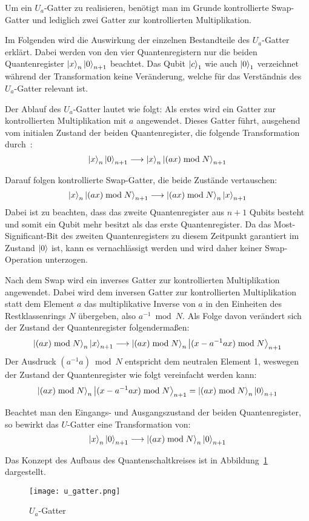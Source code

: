 Um ein \(U_a\)-Gatter zu realisieren, benötigt man im Grunde kontrollierte Swap-Gatter und 
lediglich zwei Gatter zur kontrollierten Multiplikation. 
 
Im Folgenden wird die Auswirkung der einzelnen Bestandteile des \(U_a\)-Gatter erklärt.
Dabei werden von den vier Quantenregistern nur die beiden 
Quantenregister \(\ket{x}_{n}\ket{0}_{n+1}\) beachtet.
Das Qubit \(\ket{c}_1\) wie auch \(\ket{0}_1\) verzeichnet während der Transformation keine Veränderung, 
welche für das Verständnis des \(U_a\)-Gatter relevant ist.

Der Ablauf des \(U_a\)-Gatter lautet wie folgt:
Als erstes wird ein Gatter zur kontrollierten Multiplikation mit \(a\) angewendet. 
Dieses Gatter führt, 
ausgehend vom initialen Zustand der beiden Quantenregister, 
die folgende Transformation durch~\cite{beauregard2003circuit}:
\[
  \ket{x}_{n}\ket{0}_{n+1}
  \longrightarrow
  \ket{x}_{n}\ket{(ax)\bmod N}_{n+1}
  \]

Darauf folgen kontrollierte Swap-Gatter, die beide Zustände vertauschen:
\[
  \ket{x}_{n}\ket{(ax)\bmod N}_{n+1}
\longrightarrow
\ket{(ax)\bmod N}_{n}\ket{x}_{n+1}
\]
Dabei ist zu beachten, 
dass das zweite Quantenregister aus \(n+1\) Qubits besteht und
somit ein Qubit mehr besitzt als das erste Quantenregister.
Da das Most-Significant-Bit des zweiten Quantenregisters zu diesem Zeitpunkt garantiert im Zustand \(\ket{0}\) ist, 
kann es vernachlässigt werden und wird daher keiner Swap-Operation unterzogen.

Nach dem Swap wird ein inverses Gatter zur kontrollierten Multiplikation angewendet.
Dabei wird dem inversen Gatter zur kontrollierten Multiplikation statt dem Element \(a\) 
das multiplikative Inverse von \(a\) in den Einheiten des Restklassenrings \(N\) übergeben, 
also \(a^{-1} \bmod N\).
Als Folge davon verändert sich der Zustand der Quantenregister folgendermaßen:  
\[\ket{(ax)\bmod N}_{n}\ket{x}_{n+1}
\longrightarrow
\ket{(ax)\bmod N}_{n}\ket{(x-a^{-1}ax)\bmod N}_{n+1}
\] 
Der Ausdruck \((a^{-1}a)\bmod N\) entspricht dem neutralen Element 1, 
weswegen der Zustand der Quantenregister wie folgt vereinfacht werden kann:  
\[
\ket{(ax)\bmod N}_{n}\ket{(x-a^{-1}ax)\bmod N}_{n+1}
=
\ket{(ax)\bmod N}_{n}\ket{0}_{n+1}
\] 

Beachtet man den Eingangs- und Ausgangszustand der beiden Quantenregister, 
so bewirkt das \(U\)-Gatter eine Transformation von:
 \[\ket{x}_{n}\ket{0}_{n+1} 
 \longrightarrow 
 \ket{(ax)\bmod N}_{n}\ket{0}_{n+1}\]

Das Konzept des Aufbaus des Quantenschaltkreises ist in Abbildung~\ref{fig:u_gatter} dargestellt.
\begin{figure} [H]
  \centering
  \texttt{[image: u\_gatter.png]}
  \caption{\(U_a\)-Gatter~\cite{beauregard2003circuit}}
  \label{fig:u_gatter}
\end{figure}

